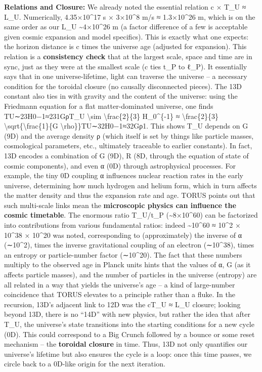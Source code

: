 \documentclass[]{article}
\begin{document}
\textbf{Relations and Closure:} We already noted the essential relation
c × T\_U ≈ L\_U​. Numerically, 4.35×10\^{}17 s × 3×10\^{}8 m/s ≈
1.3×10\^{}26 m, which is on the same order as our L\_U
\textasciitilde{}4×10\^{}26 m (a factor difference of a few is
acceptable given cosmic expansion and model specifics)​. This is exactly
what one expects: the horizon distance is c times the universe age
(adjusted for expansion). This relation is a \textbf{consistency check}
that at the largest scale, space and time are in sync, just as they were
at the smallest scale (c ties t\_P to ℓ\_P). It essentially says that in
one universe-lifetime, light can traverse the universe -- a necessary
condition for the toroidal closure (no causally disconnected pieces)​.
The 13D constant also ties in with gravity and the content of the
universe: using the Friedmann equation for a flat matter-dominated
universe, one finds TU∼23H0−1≈231GρT\_U \textbackslash{}sim
\textbackslash{}frac\{2\}\{3\} H\_0\^{}\{-1\} ≈
\textbackslash{}frac\{2\}\{3\}
\textbackslash{}sqrt\{\textbackslash{}frac\{1\}\{G
\textbackslash{}rho\}\}TU​∼32​H0−1​≈32​Gρ1​​​. This shows T\_U depends
on G (9D) and the average density ρ (which itself is set by things like
particle masses, cosmological parameters, etc., ultimately traceable to
earlier constants). In fact, 13D encodes a combination of G (9D), R (8D,
through the equation of state of cosmic components), and even α (0D)
through astrophysical processes​. For example, the tiny 0D coupling α
influences nuclear reaction rates in the early universe, determining how
much hydrogen and helium form, which in turn affects the matter density
and thus the expansion rate and age. TORUS points out that such
multi-scale links mean the \textbf{microscopic physics can influence the
cosmic timetable}. The enormous ratio T\_U/t\_P
(\textasciitilde{}8×10\^{}60) can be factorized into contributions from
various fundamental ratios: indeed \textasciitilde{}10\^{}60 ≈ 10\^{}2 ×
10\^{}38 × 10\^{}20 was noted​, corresponding to (approximately) the
inverse of α (∼10\^{}2), times the inverse gravitational coupling of an
electron (∼10\^{}38), times an entropy or particle-number factor
(∼10\^{}20). The fact that these numbers multiply to the observed age in
Planck units hints that the values of α, G (as it affects particle
masses), and the number of particles in the universe (entropy) are all
related in a way that yields the universe's age -- a kind of
large-number coincidence that TORUS elevates to a principle rather than
a fluke​. In the recursion, 13D's adjacent link to 12D was the cT\_U ≈
L\_U closure; looking beyond 13D, there is no ``14D'' with new physics,
but rather the idea that after T\_U, the universe's state transitions
into the starting conditions for a new cycle (0D)​. This could
correspond to a Big Crunch followed by a bounce or some reset mechanism
-- the \textbf{toroidal closure} in time. Thus, 13D not only quantifies
our universe's lifetime but also ensures the cycle is a loop: once this
time passes, we circle back to a 0D-like origin for the next iteration.
\end{document}

